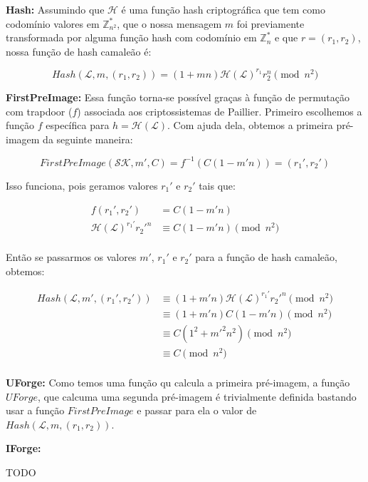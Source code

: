 \documentclass[a4paper]{article}
\begin{document}
\textbf{Hash: } Assumindo que $\mathcal{H}$ é uma função hash
criptográfica que tem como codomínio valores em $\mathbb{Z}^*_{n^2}$,
que o nossa mensagem $m$ foi previamente transformada por alguma
função hash com codomínio em $\mathbb{Z}^*_{n}$ e que $r = (r_1,
r_2)$, nossa função de hash camaleão é:

$$
Hash(\mathcal{L}, m, (r_1, r_2)) = (1 +mn)\mathcal{H}(\mathcal{L})^{r_1}r_2^n \pmod{n^2}
$$

\textbf{FirstPreImage:} Essa função torna-se possível graças à função
de permutação com trapdoor ($f$) associada aos criptossistemas de
Paillier. Primeiro escolhemos a função $f$ específica para
$h=\mathcal{H}(\mathcal{L})$. Com ajuda dela, obtemos a primeira
pré-imagem da seguinte maneira:

$$
FirstPreImage(\mathcal{SK}, m', C) = f^{-1}(C(1-m'n)) = (r_1', r_2')
$$

Isso funciona, pois geramos valores $r_1'$ e $r_2'$ tais que:

\begin{equation}
\begin{split}
  f(r_1', r_2') &= C(1-m'n)\\
  \mathcal{H}(\mathcal{L})^{r_1'}r_2'^n &\equiv C(1-m'n) \pmod{n^2}\\
\end{split}
\end{equation}

Então se passarmos os valores $m'$, $r_1'$ e $r_2'$ para a função de
hash camaleão, obtemos:

\begin{equation}
\begin{split}
  Hash(\mathcal{L}, m', (r_1', r_2')) &\equiv (1+m'n)\mathcal{H}(\mathcal{L})^{r_1'}r_2'^n \pmod{n^2}\\
  &\equiv (1+m'n)C(1-m'n) \pmod{n^2}\\
  &\equiv C(1^2+m'^2n^2) \pmod{n^2}\\
  &\equiv C \pmod{n^2}\\
\end{split}
\end{equation}

\textbf{UForge:} Como temos uma função qu calcula a primeira
pré-imagem, a função $UForge$, que calcuma uma segunda pré-imagem é
trivialmente definida bastando usar a função $FirstPreImage$ e passar
para ela o valor de $Hash(\mathcal{L}, m, (r_1, r_2))$.

\textbf{IForge: }

TODO
\end{document}
